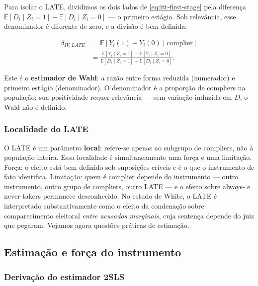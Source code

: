 \documentclass[
]{article}
\begin{document}
Para isolar o LATE, dividimos os dois lados de \eqref{eq:itt-first-stage} pela diferença \(\mathbb{E}[D_i \mid Z_i = 1] - \mathbb{E}[D_i \mid Z_i = 0]\) --- o primeiro estágio. Sob relevância, esse denominador é diferente de zero, e a divisão é bem definida:

\begin{equation}
\begin{aligned}
\delta_{IV,LATE} &= \mathbb{E}[Y_i(1) - Y_i(0) \mid \text{complier}] \\
                 &= \frac{\mathbb{E}[Y_i \mid Z_i = 1] - \mathbb{E}[Y_i \mid Z_i = 0]}
                         {\mathbb{E}[D_i \mid Z_i = 1] - \mathbb{E}[D_i \mid Z_i = 0]}.
\end{aligned}
\label{eq:wald}
\end{equation}

Este é o \textbf{estimador de Wald}: a razão entre forma reduzida (numerador) e primeiro estágio (denominador). O denominador é a proporção de compliers na população; sua positividade requer relevância --- sem variação induzida em \(D\), o Wald não é definido.

\subsubsection{Localidade do LATE}\label{localidade-do-late}

O LATE é um parâmetro \textbf{local}: refere-se apenas ao subgrupo de compliers, não à população inteira. Essa localidade é simultaneamente uma força e uma limitação. Força: o efeito está bem definido sob suposições críveis e é o que o instrumento de fato identifica. Limitação: quem é complier depende do instrumento --- outro instrumento, outro grupo de compliers, outro LATE --- e o efeito sobre always- e never-takers permanece desconhecido. No estudo de White, o LATE é interpretado substantivamente como o efeito da condenação sobre comparecimento eleitoral \emph{entre acusados marginais}, cuja sentença depende do juiz que pegaram. Vejamos agora questões práticas de estimação.

\subsection{Estimação e força do instrumento}\label{estimauxe7uxe3o-e-foruxe7a-do-instrumento}

\subsubsection{Derivação do estimador 2SLS}\label{derivauxe7uxe3o-do-estimador-2sls}
\end{document}
